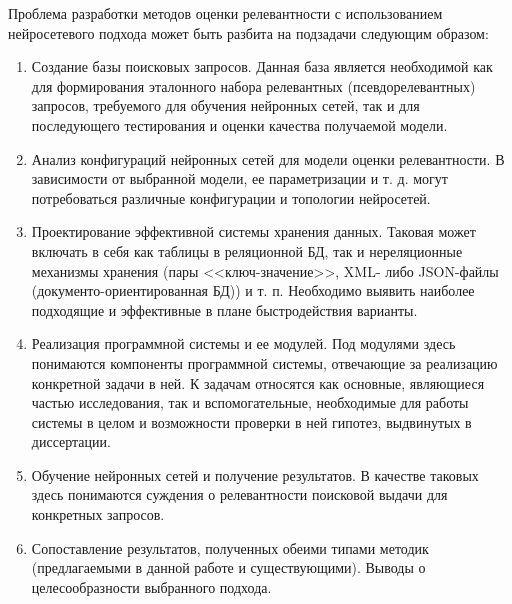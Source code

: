 Проблема разработки методов оценки релевантности с использованием нейросетевого подхода может быть
разбита на подзадачи следующим образом:
\begin{enumerate}[1)]
    \item Создание базы поисковых запросов. Данная база является необходимой как для формирования эталонного
          набора релевантных (псевдорелевантных) запросов, требуемого для обучения нейронных сетей, так и для последующего
          тестирования и оценки качества получаемой модели.
    \item Анализ конфигураций нейронных сетей для модели оценки релевантности. В зависимости от выбранной модели,
          ее параметризации и т. д. могут потребоваться различные конфигурации и топологии нейросетей.
    \item Проектирование эффективной системы хранения данных. Таковая может включать в себя как таблицы в реляционной
          БД, так и нереляционные механизмы хранения (пары <<ключ-значение>>, XML- либо JSON-файлы (документо-ориентированная БД))
          и т. п. Необходимо выявить наиболее подходящие и эффективные в плане быстродействия варианты.
    \item Реализация программной системы и ее модулей. Под модулями здесь понимаются компоненты программной системы,
          отвечающие за реализацию конкретной задачи в ней. К задачам относятся как основные, являющиеся частью исследования,
          так и вспомогательные, необходимые для работы системы в целом и возможности проверки в ней гипотез, выдвинутых в диссертации.
    \item Обучение нейронных сетей и получение результатов. В качестве таковых здесь понимаются суждения о релевантности
          поисковой выдачи для конкретных запросов.
    \item Сопоставление результатов, полученных обеими типами методик (предлагаемыми в данной работе и существующими).
          Выводы о целесообразности выбранного подхода.
\end{enumerate}